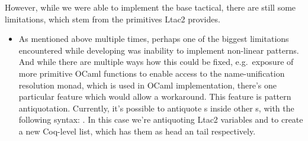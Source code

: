 However, while we were able to implement the base tactical, there are still some limitations, which stem from the primitives Ltac2 provides.
\begin{itemize}
\item
  As mentioned above multiple times, perhaps one of the biggest limitations encountered while developing  was inability to implement non-linear patterns.
And while there are multiple ways how this could be fixed, e.g.\ exposure of more primitive
OCaml functions to enable access to the name-unification resolution monad, which is used in OCaml implementation, there's one particular feature which would allow a workaround.
  This feature is pattern antiquotation.
  Currently, it's possible to antiquote s inside other s, with the following syntax: .
    In this case we're antiquoting Ltac2 variables  and  to create a new Coq-level list, which has them as head an tail respectively.


\end{itemize}
